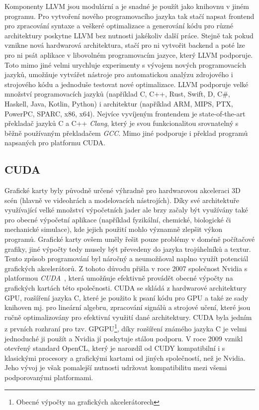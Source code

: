 Komponenty LLVM jsou modulární a je snadné je použít jako knihovnu v jiném programu. Pro vytvoření nového programovacího jazyka tak stačí napsat frontend pro zpracování syntaxe a veškeré optimalizace a generování kódu pro různé architektury poskytne LLVM bez nutnosti jakékoliv další práce. Stejně tak pokud vznikne nová hardwarová architektura, stačí pro ni vytvořit backend a poté lze pro ni psát aplikace v libovolném programovacím jazyce, který LLVM podporuje. Toto mimo jiné velmi urychluje experimenty s vývojem nových programovacích jazyků, umožňuje vytvářet nástroje pro automatickou analýzu zdrojového i strojového kódu a jednoduše testovat nové optimalizace.
LLVM podporuje velké množství programovacích jazyků (například C, C++, Rust, Swift, D, C\#, Haskell, Java, Kotlin, Python) i architektur (například ARM, MIPS, PTX, PowerPC, SPARC, x86, x64). Nejvíce vyvíjeným frontendem je state-of-the-art překladač jazyků C a C++ \emph{Clang}, který je svou funkcionalitou srovnatelný s běžně používaným překladačem \emph{GCC}. Mimo jiné podporuje i překlad programů napsaných pro platformu CUDA.

\subsection{CUDA}
Grafické karty byly původně určené výhradně pro hardwarovou akceleraci 3D scén (hlavně ve videohrách a modelovacích nástrojích). Díky své architektuře využívající velké množství výpočetních jader ale brzy začaly být využívány také pro obecné výpočetní aplikace (například fyzikální, chemické, biologické či mechanické simulace), kde jejich použití mohlo významně zlepšit výkon programů. Grafické karty ovšem uměly řešit pouze problémy v doméně počítačové grafiky, jiné výpočty tedy musely být převedeny do jazyka trojúhelníků a textur. Tento způsob programování byl náročný a neumožňoval naplno využít potenciál grafických akcelerátorů. Z tohoto důvodu přišla v roce 2007 společnost Nvidia s platformou \emph{CUDA}~\cite{cuda}, která umožňuje efektivně provádět obecné výpočty na grafických kartách této společnosti. CUDA se skládá z hardwarové architektury GPU, rozšíření jazyka C, které je použito k psaní kódu pro GPU a také ze sady knihoven mj. pro lineární algebru, zpracování signálů a strojové učení, které jsou ručně optimalizovány pro efektivní využití dané architektury. CUDA byla jedním z prvních rozhraní pro tzv. GPGPU\footnote{Obecné výpočty na grafických akcelerátorech}, díky rozšíření známého jazyka C je velmi jednoduché ji použít a Nvidia jí poskytuje stálou podporu. V roce 2009 vznikl otevřený standard OpenCL, který je narozdíl od CUDY kompatibilní i s klasickými procesory a grafickými kartami od jiných společností, než je Nvidia. Jeho vývoj je však pomalejší nutnosti udržovat kompatibilitu mezi všemi podporovanými platformami.

